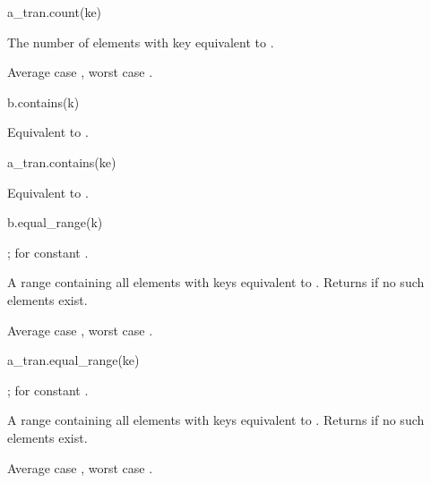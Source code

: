 %
\begin{itemdecl}
a_tran.count(ke)
\end{itemdecl}

\begin{itemdescr}
\pnum
\result
{}

\pnum
\returns
The number of elements with key equivalent to .

\pnum
\complexity
Average case ,
worst case .
\end{itemdescr}

%
\begin{itemdecl}
b.contains(k)
\end{itemdecl}

\begin{itemdescr}
\pnum
\effects
Equivalent to .
\end{itemdescr}

%
\begin{itemdecl}
a_tran.contains(ke)
\end{itemdecl}

\begin{itemdescr}
\pnum
\effects
Equivalent to .
\end{itemdescr}

%
\begin{itemdecl}
b.equal_range(k)
\end{itemdecl}

\begin{itemdescr}
\pnum
\result
{};
 for constant .

\pnum
\returns
A range containing all elements with keys equivalent to .
Returns  if no such elements exist.

\pnum
\complexity
Average case , worst case .
\end{itemdescr}

%
\begin{itemdecl}
a_tran.equal_range(ke)
\end{itemdecl}

\begin{itemdescr}
\pnum
\result
{};
 for constant .

\pnum
\returns
A range containing all elements with keys equivalent to .
Returns  if no such elements exist.

\pnum
\complexity
Average case ,
worst case .
\end{itemdescr}

